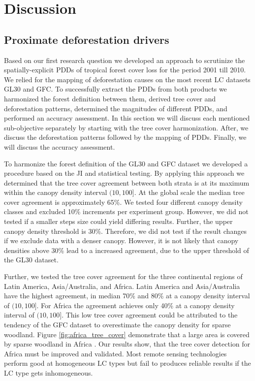 \chapter{Discussion}
\label{ch:discussion}

	\section{Proximate deforestation drivers}
	\label{sec:discussion_deforestation}
		Based on our first research question we developed an approach to scrutinize the spatially-explicit \acp{PDD} of tropical forest cover loss for the period 2001 till 2010. We relied for the mapping of deforestation causes on the most recent \ac{LC} datasets \ac{GL30} and \ac{GFC}. To successfully extract the \acp{PDD} from both products we harmonized the forest definition between them, derived tree cover and deforestation patterns, determined the magnitudes of different \acp{PDD}, and performed an accuracy assessment. In this section we will discuss each mentioned sub-objective separately by starting with the tree cover harmonization. After, we discuss the deforestation patterns followed by the mapping of \acp{PDD}. Finally, we will discuss the accuracy assessment. 

		To harmonize the forest definition of the \ac{GL30} and \ac{GFC} dataset we developed a procedure based on the \ac{JI} and statistical testing. By applying this approach we determined that the tree cover agreement between both strata is at its maximum within the canopy density interval $(10,100]$. At the global scale the median tree cover agreement is approximately 65\%. We tested four different canopy density classes and excluded 10\% increments per experiment group. However, we did not tested if a smaller steps size could yield differing results. Further, the upper canopy density threshold is 30\%. Therefore, we did not test if the result changes if we exclude data with a denser canopy. However, it is not likely that canopy densities above 30\% lead to a increased agreement, due to the upper threshold of the \ac{GL30} dataset. 

		Further, we tested the tree cover agreement for the three continental regions of Latin America, Asia/Australia, and Africa. Latin America and Asia/Australia have the highest agreement, in median 70\% and 80\% at a canopy density interval of $(10,100]$. For Africa the agreement achieves only 40\% at a canopy density interval of $(10,100]$. This low tree cover agreement could be attributed to the tendency of the \ac{GFC} dataset to overestimate the canopy density for sparse woodland. Figure \ref{fig:africa_tree_cover} demonstrate that a large area is covered by sparse woodland in Africa \citep{Gross2017}. Our results show, that the tree cover detection for Africa must be improved and validated. Most remote sensing technologies perform good at homogeneous \ac{LC} types but fail to produces reliable results if the \ac{LC} type gets inhomogeneous.

